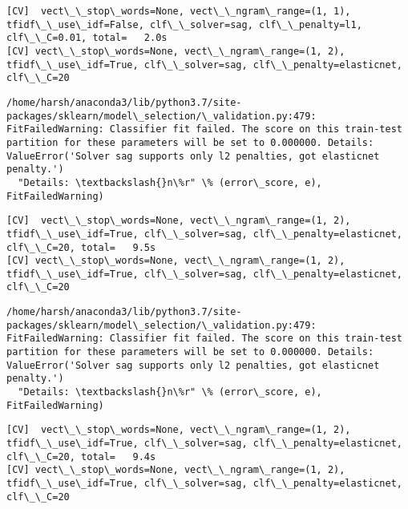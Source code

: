 \documentclass[11pt]{article}
\begin{document}
    \begin{Verbatim}[commandchars=\\\{\}]
[CV]  vect\_\_stop\_words=None, vect\_\_ngram\_range=(1, 1), tfidf\_\_use\_idf=False, clf\_\_solver=sag, clf\_\_penalty=l1, clf\_\_C=0.01, total=   2.0s
[CV] vect\_\_stop\_words=None, vect\_\_ngram\_range=(1, 2), tfidf\_\_use\_idf=True, clf\_\_solver=sag, clf\_\_penalty=elasticnet, clf\_\_C=20 

    \end{Verbatim}

    \begin{Verbatim}[commandchars=\\\{\}]
/home/harsh/anaconda3/lib/python3.7/site-packages/sklearn/model\_selection/\_validation.py:479: FitFailedWarning: Classifier fit failed. The score on this train-test partition for these parameters will be set to 0.000000. Details: 
ValueError('Solver sag supports only l2 penalties, got elasticnet penalty.')
  "Details: \textbackslash{}n\%r" \% (error\_score, e), FitFailedWarning)

    \end{Verbatim}

    \begin{Verbatim}[commandchars=\\\{\}]
[CV]  vect\_\_stop\_words=None, vect\_\_ngram\_range=(1, 2), tfidf\_\_use\_idf=True, clf\_\_solver=sag, clf\_\_penalty=elasticnet, clf\_\_C=20, total=   9.5s
[CV] vect\_\_stop\_words=None, vect\_\_ngram\_range=(1, 2), tfidf\_\_use\_idf=True, clf\_\_solver=sag, clf\_\_penalty=elasticnet, clf\_\_C=20 

    \end{Verbatim}

    \begin{Verbatim}[commandchars=\\\{\}]
/home/harsh/anaconda3/lib/python3.7/site-packages/sklearn/model\_selection/\_validation.py:479: FitFailedWarning: Classifier fit failed. The score on this train-test partition for these parameters will be set to 0.000000. Details: 
ValueError('Solver sag supports only l2 penalties, got elasticnet penalty.')
  "Details: \textbackslash{}n\%r" \% (error\_score, e), FitFailedWarning)

    \end{Verbatim}

    \begin{Verbatim}[commandchars=\\\{\}]
[CV]  vect\_\_stop\_words=None, vect\_\_ngram\_range=(1, 2), tfidf\_\_use\_idf=True, clf\_\_solver=sag, clf\_\_penalty=elasticnet, clf\_\_C=20, total=   9.4s
[CV] vect\_\_stop\_words=None, vect\_\_ngram\_range=(1, 2), tfidf\_\_use\_idf=True, clf\_\_solver=sag, clf\_\_penalty=elasticnet, clf\_\_C=20 

    \end{Verbatim}
\end{document}
